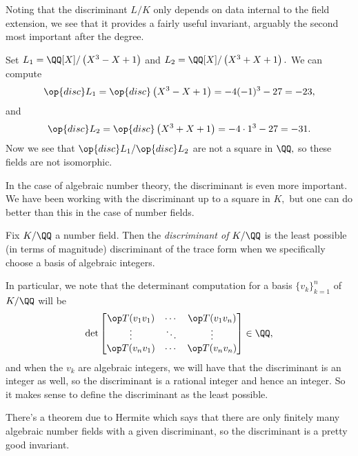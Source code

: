 Noting that the discriminant $L/K$ only depends on data internal to the field extension, we see that it provides a fairly useful invariant, arguably the second most important after the degree.
\begin{example}
	Set $L_1=\QQ[X]/\left(X^3-X+1\right)$ and $L_2=\QQ[X]/\left(X^3+X+1\right).$ We can compute
	\[\op{disc}L_1=\op{disc}\left(X^3-X+1\right)=-4(-1)^3-27=-23,\]
	and
	\[\op{disc}L_2=\op{disc}\left(X^3+X+1\right)=-4\cdot1^3-27=-31.\]
	Now we see that $\op{disc}L_1/\op{disc}L_2$ are not a square in $\QQ,$ so these fields are not isomorphic.
\end{example}
In the case of algebraic number theory, the discriminant is even more important. We have been working with the discriminant up to a square in $K,$ but one can do better than this in the case of number fields.
\begin{definition}
	Fix $K/\QQ$ a number field. Then the \textit{discriminant of $K/\QQ$} is the least possible (in terms of magnitude) discriminant of the trace form when we specifically choose a basis of algebraic integers.
\end{definition}
In particular, we note that the determinant computation for a basis $\{v_k\}_{k=1}^n$ of $K/\QQ$ will be
\[\det\begin{bmatrix}
	\op T(v_1v_1) & \cdots & \op T(v_1v_n) \\
	\vdots & \ddots & \vdots \\
	\op T(v_nv_1) & \cdots & \op T(v_nv_n)
\end{bmatrix}\in\QQ,\]
and when the $v_k$ are algebraic integers, we will have that the discriminant is an integer as well, so the discriminant is a rational integer and hence an integer. So it makes sense to define the discriminant as the least possible.
\begin{remark}
	There's a theorem due to Hermite which says that there are only finitely many algebraic number fields with a given discriminant, so the discriminant is a pretty good invariant.
\end{remark}

